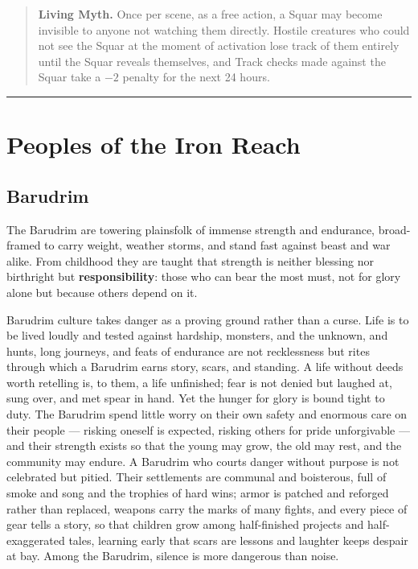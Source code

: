 \begin{quote}
\textbf{Living Myth.} Once per scene, as a free action, a Squar may become invisible to anyone not watching them directly. Hostile creatures who could not see the Squar at the moment of activation lose track of them entirely until the Squar reveals themselves, and Track checks made against the Squar take a $-2$ penalty for the next 24 hours.
\end{quote}

\bigskip
\hrule
\bigskip

\section{Peoples of the Iron Reach}

\subsection{Barudrim}

The Barudrim are towering plainsfolk of immense strength and endurance, broad-framed to carry weight, weather storms, and stand fast against beast and war alike. From childhood they are taught that strength is neither blessing nor birthright but \textbf{responsibility}: those who can bear the most must, not for glory alone but because others depend on it.

Barudrim culture takes danger as a proving ground rather than a curse. Life is to be lived loudly and tested against hardship, monsters, and the unknown, and hunts, long journeys, and feats of endurance are not recklessness but rites through which a Barudrim earns story, scars, and standing. A life without deeds worth retelling is, to them, a life unfinished; fear is not denied but laughed at, sung over, and met spear in hand. Yet the hunger for glory is bound tight to duty. The Barudrim spend little worry on their own safety and enormous care on their people --- risking oneself is expected, risking others for pride unforgivable --- and their strength exists so that the young may grow, the old may rest, and the community may endure. A Barudrim who courts danger without purpose is not celebrated but pitied. Their settlements are communal and boisterous, full of smoke and song and the trophies of hard wins; armor is patched and reforged rather than replaced, weapons carry the marks of many fights, and every piece of gear tells a story, so that children grow among half-finished projects and half-exaggerated tales, learning early that scars are lessons and laughter keeps despair at bay. Among the Barudrim, silence is more dangerous than noise.

